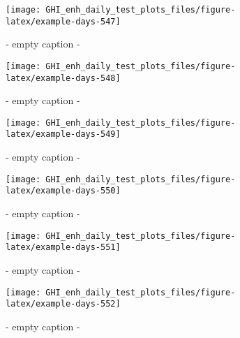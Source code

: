 \documentclass[
  10pt,
  a4paper,oneside]{article}
\begin{document}
\begin{figure}[H]

{\centering \texttt{[image: GHI\_enh\_daily\_test\_plots\_files/figure-latex/example-days-547]} 

}

\caption{ - empty caption - }\label{fig:example-days-547}
\end{figure}

\begin{figure}[H]

{\centering \texttt{[image: GHI\_enh\_daily\_test\_plots\_files/figure-latex/example-days-548]} 

}

\caption{ - empty caption - }\label{fig:example-days-548}
\end{figure}

\begin{figure}[H]

{\centering \texttt{[image: GHI\_enh\_daily\_test\_plots\_files/figure-latex/example-days-549]} 

}

\caption{ - empty caption - }\label{fig:example-days-549}
\end{figure}

\begin{figure}[H]

{\centering \texttt{[image: GHI\_enh\_daily\_test\_plots\_files/figure-latex/example-days-550]} 

}

\caption{ - empty caption - }\label{fig:example-days-550}
\end{figure}

\begin{figure}[H]

{\centering \texttt{[image: GHI\_enh\_daily\_test\_plots\_files/figure-latex/example-days-551]} 

}

\caption{ - empty caption - }\label{fig:example-days-551}
\end{figure}

\begin{figure}[H]

{\centering \texttt{[image: GHI\_enh\_daily\_test\_plots\_files/figure-latex/example-days-552]} 

}

\caption{ - empty caption - }\label{fig:example-days-552}
\end{figure}
\end{document}
